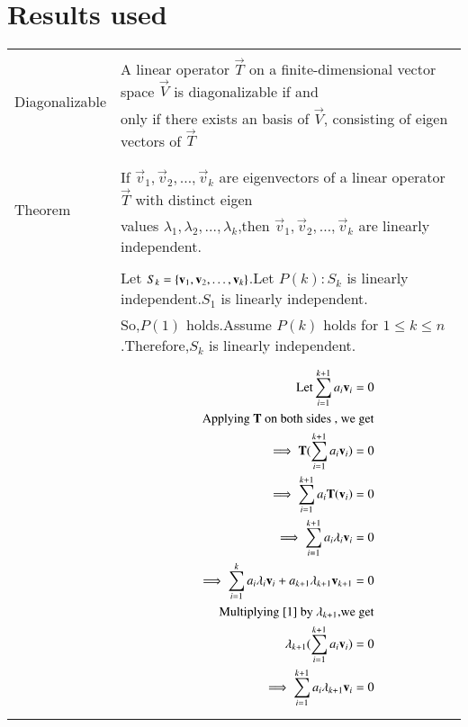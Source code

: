 \documentclass[journal,12pt]{IEEEtran}
\begin{document}
\section{\textbf{Results used}}
\renewcommand{\thetable}{1}
\begin{longtable}{|l|l|}
	\hline
	\multirow{3}{*}{Diagonalizable} 
	& \\
	& A linear operator $\vec{T}$ on a finite-dimensional vector space $\vec{V}$ is diagonalizable if and\\
    &only if there exists an basis of $\vec{V}$, consisting of eigen vectors of $\vec{T}$ \\ 
	&\\
	\hline
	\multirow{3}{*}{Theorem}
	& \\
&If $\vec{v}_1,\vec{v}_2,\dots,\vec{v}_k$ are eigenvectors of a linear operator $\vec{T}$ with distinct eigen\\
& values $\lambda_1,\lambda_2,\dots,\lambda_k$,then $\vec{v}_1,\vec{v}_2,\dots,\vec{v}_k$ are linearly independent.\\
&\\
&Let $S_k=\cbrak{\vec{v}_1,\vec{v}_2,\dots,\vec{v}_k}$.Let $P(k): S_k$ is linearly independent.$S_1$ is linearly independent.\\
&So,$P(1)$ holds.Assume $P(k)$ holds for $1 \le k \le n$.Therefore,$S_k$ is linearly independent.\\
&\parbox{10cm}{\begin{align}
\text{Let} \sum_{i=1}^{k+1} a_i\vec{v}_i = 0 \label{1}\\
\text{Applying $\vec{T}$ on both sides , we get} \nonumber\\
\implies \vec{T}(\sum_{i=1}^{k+1} a_i\vec{v}_i)=0\\
\implies \sum_{i=1}^{k+1}a_i\vec{T}(\vec{v}_i)=0\\
\implies \sum_{i=1}^{k+1}a_i\lambda_i\vec{v}_i=0\\
\implies\sum_{i=1}^{k}a_i\lambda_i\vec{v}_i+a_{k+1}\lambda_{k+1}\vec{v}_{k+1}=0
\label{2}\\
\text{Multiplying \eqref{1} by $\lambda_{k+1}$,we get} \nonumber\\
\lambda_{k+1}(\sum_{i=1}^{k+1} a_i\vec{v}_i)=0\\
\implies \sum_{i=1}^{k+1}a_i\lambda_{k+1}\vec{v}_i=0
\end{align}}\\
\hline
&\parbox{10cm}{\begin{align}
\implies\sum_{i=1}^{k}a_i\lambda_{k+1}\vec{v}_i+a_{k+1}\lambda_{k+1}\vec{v}_{k+1}=0\label{3}\\

\end{align}}
\end{longtable}
\end{document}
